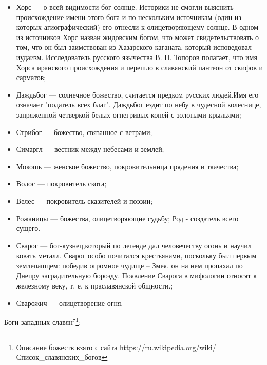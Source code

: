 \documentclass[a4paper, 12pt]{report}
\begin{document}
\begin{itemize}
  \item Хорс — о всей видимости бог-солнце. Историки не смогли выяснить происхождение имени этого бога и по нескольким источникам (один из которых агиографический) его отнесли к олицетворяющему солнце. В одном из источников Хорс назван жидовским богом, что может свидетельствовать о том, что он был заимствован из Хазарского каганата, который исповедовал иудаизм. Исследователь русского язычества В. Н. Топоров полагает, что имя Хорса иранского происхождения и перешло в славянский пантеон от скифов и сарматов;
  \item Даждьбог — солнечное божество, считается предком русских людей.Имя его означает "податель всех благ". Даждьбог ездит по небу в чудесной колеснице, запряженной четверкой белых огнегривых коней с золотыми крыльями;
  \item Стрибог — божество, связанное с ветрами;
  \item Симаргл — вестник между небесами и землей;
  \item Мокошь — женское божество, покровительница прядения и ткачества;
  \item Волос — покровитель скота;
  \item Велес — покровитель сказителей и поэзии;
  \item Рожаницы — божества, олицетворяющие судьбу;
  Род - создатель всего сущего. 
  \item Сварог — бог-кузнец,который по легенде дал человечеству огонь и научил ковать металл. Сварог особо почитался крестьянами, поскольку был первым землепашцем: победив огромное чудище – Змея, он на нем пропахал по Днепру заградительную борозду. Появление Сварога в мифологии относят к железному веку, т. е. к праславянской общности.;
  \item Сварожич — олицетворение огня.
\end{itemize}

Боги западных славян$^7$\footnote{Описание божеств взято с сайта https://ru.wikipedia.org/wiki/Список\_славянских\_богов}:
\end{document}
